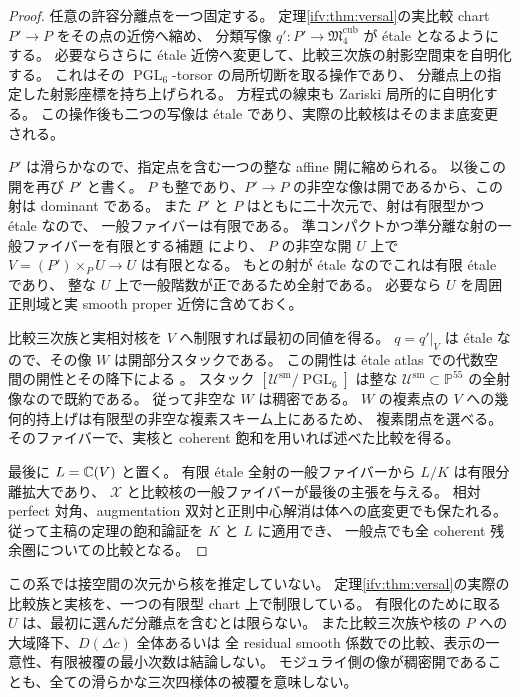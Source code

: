 \begin{proof}
任意の許容分離点を一つ固定する。
定理\ref{ifv:thm:versal}の実比較 chart $P'\to P$ をその点の近傍へ縮め、
分類写像 $q':P'\to\mathfrak M_4^{\mathrm{cub}}$ が \'etale となるようにする。
必要ならさらに \'etale 近傍へ変更して、比較三次族の射影空間束を自明化する。
これはその $\operatorname{PGL}_6$-torsor の局所切断を取る操作であり、
分離点上の指定した射影座標を持ち上げられる。
方程式の線束も Zariski 局所的に自明化する。
この操作後も二つの写像は \'etale であり、実際の比較核はそのまま底変更される。

$P'$ は滑らかなので、指定点を含む一つの整な affine 開に縮められる。
以後この開を再び $P'$ と書く。
$P$ も整であり、$P'\to P$ の非空な像は開であるから、この射は dominant である。
また $P'$ と $P$ はともに二十次元で、射は有限型かつ \'etale なので、
一般ファイバーは有限である。
準コンパクトかつ準分離な射の一般ファイバーを有限とする補題
\cite[Tag~02NW]{IFVStacksGeneric}により、
$P$ の非空な開 $U$ 上で
$V=(P')\times_P U\to U$ は有限となる。
もとの射が \'etale なのでこれは有限 \'etale であり、
整な $U$ 上で一般階数が正であるため全射である。
必要なら $U$ を周囲正則域と実 smooth proper 近傍に含めておく。

比較三次族と実相対核を $V$ へ制限すれば最初の同値を得る。
$q=q'|_V$ は \'etale なので、その像 $W$ は開部分スタックである。
この開性は \'etale atlas での代数空間の開性とその降下による
\cite[Tags~03FQ, 04XB]{IFVStacksGeneric}。
スタック $[\mathcal U^{\mathrm{sm}}/\operatorname{PGL}_6]$ は整な
$\mathcal U^{\mathrm{sm}}\subset\mathbb P^{55}$ の全射像なので既約である。
従って非空な $W$ は稠密である。
$W$ の複素点の $V$ への幾何的持上げは有限型の非空な複素スキーム上にあるため、
複素閉点を選べる。そのファイバーで、実核と coherent 飽和を用いれば述べた比較を得る。

最後に $L=\mathbb C(V)$ と置く。
有限 \'etale 全射の一般ファイバーから $L/K$ は有限分離拡大であり、
$\mathcal X$ と比較核の一般ファイバーが最後の主張を与える。
相対 perfect 対角、augmentation 双対と正則中心解消は体への底変更でも保たれる。
従って主稿の定理の飽和論証を $K$ と $L$ に適用でき、
一般点でも全 coherent 残余圏についての比較となる。
\end{proof}

\begin{remark}[一般係数への移行の範囲]
\label{ifv:rem:generic-scope}
この系では接空間の次元から核を推定していない。
定理\ref{ifv:thm:versal}の実際の比較族と実核を、一つの有限型 chart 上で制限している。
有限化のために取る $U$ は、最初に選んだ分離点を含むとは限らない。
また比較三次族や核の $P$ への大域降下、$D(\Delta c)$ 全体あるいは
全 residual smooth 係数での比較、表示の一意性、有限被覆の最小次数は結論しない。
モジュライ側の像が稠密開であることも、全ての滑らかな三次四様体の被覆を意味しない。
\end{remark}

